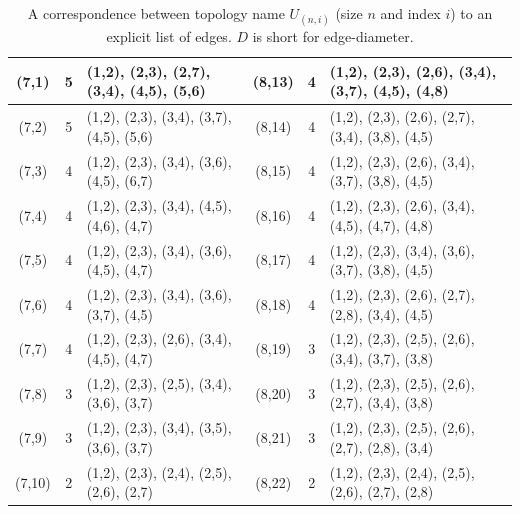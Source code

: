 \begin{table}[!ht]
\begin{center}
\begin{tabular}{|c|c|l|||c|c|l|}
    \hline
    (7,1) & 5 & (1,2), (2,3), (2,7), (3,4), (4,5), (5,6) & (8,13) & 4 & (1,2), (2,3), (2,6), (3,4), (3,7), (4,5), (4,8) \\
    \hline
    (7,2) & 5 & (1,2), (2,3), (3,4), (3,7), (4,5), (5,6) & (8,14) & 4 & (1,2), (2,3), (2,6), (2,7), (3,4), (3,8), (4,5) \\
    \hline
    (7,3) & 4 & (1,2), (2,3), (3,4), (3,6), (4,5), (6,7) & (8,15) & 4 & (1,2), (2,3), (2,6), (3,4), (3,7), (3,8), (4,5) \\
    \hline
    (7,4) & 4 & (1,2), (2,3), (3,4), (4,5), (4,6), (4,7) & (8,16) & 4 & (1,2), (2,3), (2,6), (3,4), (4,5), (4,7), (4,8) \\
    \hline
    (7,5) & 4 & (1,2), (2,3), (3,4), (3,6), (4,5), (4,7) & (8,17) & 4 & (1,2), (2,3), (3,4), (3,6), (3,7), (3,8), (4,5) \\
    \hline
    (7,6) & 4 & (1,2), (2,3), (3,4), (3,6), (3,7), (4,5) & (8,18) & 4 & (1,2), (2,3), (2,6), (2,7), (2,8), (3,4), (4,5) \\
    \hline
    (7,7) & 4 & (1,2), (2,3), (2,6), (3,4), (4,5), (4,7) & (8,19) & 3 & (1,2), (2,3), (2,5), (2,6), (3,4), (3,7), (3,8) \\
    \hline
    (7,8) & 3 & (1,2), (2,3), (2,5), (3,4), (3,6), (3,7) & (8,20) & 3 & (1,2), (2,3), (2,5), (2,6), (2,7), (3,4), (3,8) \\
    \hline
    (7,9) & 3 & (1,2), (2,3), (3,4), (3,5), (3,6), (3,7) & (8,21) & 3 & (1,2), (2,3), (2,5), (2,6), (2,7), (2,8), (3,4) \\
    \hline
    (7,10) & 2 & (1,2), (2,3), (2,4), (2,5), (2,6), (2,7) & (8,22) & 2 & (1,2), (2,3), (2,4), (2,5), (2,6), (2,7), (2,8) \\
    \hline
    \end{tabular}
    \end{center}
    \caption{\footnotesize{A correspondence between topology name $U_{(n,i)}$ (size $n$ and index $i$) to an explicit list of edges. $D$ is short for edge-diameter.}}
    \label{table_trees_edges}
\end{table}